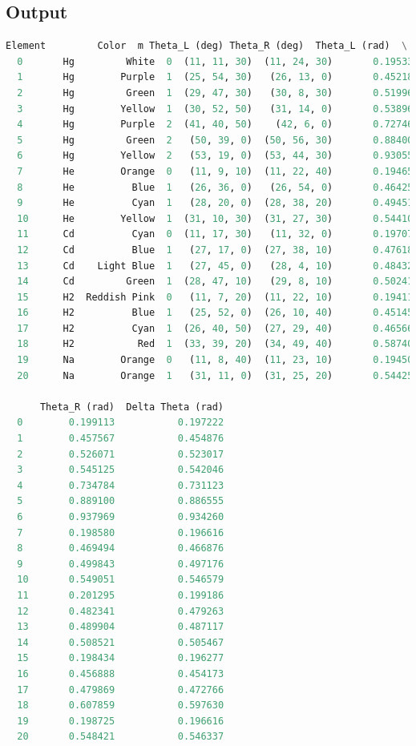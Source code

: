 \documentclass[a4paper,11pt]{article}
\begin{document}
\subsection*{Output}
\begin{lstlisting}[language=Python]
  Element         Color  m Theta_L (deg) Theta_R (deg)  Theta_L (rad)  \
  0       Hg         White  0  (11, 11, 30)  (11, 24, 30)       0.195331   
  1       Hg        Purple  1  (25, 54, 30)   (26, 13, 0)       0.452186   
  2       Hg         Green  1  (29, 47, 30)   (30, 8, 30)       0.519963   
  3       Hg        Yellow  1  (30, 52, 50)   (31, 14, 0)       0.538967   
  4       Hg        Purple  2  (41, 40, 50)    (42, 6, 0)       0.727463   
  5       Hg         Green  2   (50, 39, 0)  (50, 56, 30)       0.884009   
  6       Hg        Yellow  2   (53, 19, 0)  (53, 44, 30)       0.930551   
  7       He        Orange  0   (11, 9, 10)  (11, 22, 40)       0.194653   
  8       He          Blue  1   (26, 36, 0)   (26, 54, 0)       0.464258   
  9       He          Cyan  1   (28, 20, 0)  (28, 38, 20)       0.494510   
  10      He        Yellow  1  (31, 10, 30)  (31, 27, 30)       0.544106   
  11      Cd          Cyan  0  (11, 17, 30)   (11, 32, 0)       0.197077   
  12      Cd          Blue  1   (27, 17, 0)  (27, 38, 10)       0.476184   
  13      Cd    Light Blue  1   (27, 45, 0)   (28, 4, 10)       0.484329   
  14      Cd         Green  1  (28, 47, 10)   (29, 8, 10)       0.502412   
  15      H2  Reddish Pink  0   (11, 7, 20)  (11, 22, 10)       0.194119   
  16      H2          Blue  1   (25, 52, 0)  (26, 10, 40)       0.451458   
  17      H2          Cyan  1  (26, 40, 50)  (27, 29, 40)       0.465664   
  18      H2           Red  1  (33, 39, 20)  (34, 49, 40)       0.587400   
  19      Na        Orange  0   (11, 8, 40)  (11, 23, 10)       0.194507   
  20      Na        Orange  1   (31, 11, 0)  (31, 25, 20)       0.544252   
  
      Theta_R (rad)  Delta Theta (rad)  
  0        0.199113           0.197222  
  1        0.457567           0.454876  
  2        0.526071           0.523017  
  3        0.545125           0.542046  
  4        0.734784           0.731123  
  5        0.889100           0.886555  
  6        0.937969           0.934260  
  7        0.198580           0.196616  
  8        0.469494           0.466876  
  9        0.499843           0.497176  
  10       0.549051           0.546579  
  11       0.201295           0.199186  
  12       0.482341           0.479263  
  13       0.489904           0.487117  
  14       0.508521           0.505467  
  15       0.198434           0.196277  
  16       0.456888           0.454173  
  17       0.479869           0.472766  
  18       0.607859           0.597630  
  19       0.198725           0.196616  
  20       0.548421           0.546337
\end{lstlisting}
\newpage
%
\end{document}
